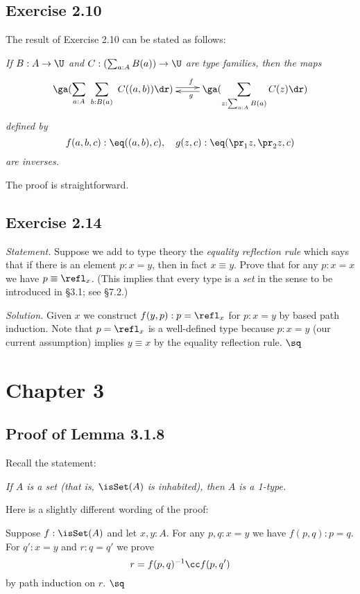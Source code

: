 \documentclass[12pt]{article}
\begin{document}

\subsection{Exercise 2.10}\label{210}

The result of Exercise 2.10 can be stated as follows:

\emph{If $B:A\to\U$ and $C:(\sum_{a:A}B(a))\to\U$ are type families, then the maps
$$
\xymatrix{
\displaystyle\ga(\sum_{a:A}\ \sum_{b:B(a)}\ C((a,b))\dr)\ar@<2pt>[r]^(.55)f&\displaystyle\ga(\sum_{z:\sum_{a:A}B(a)}C(z)\dr)\ar@<2pt>[l]^(.45)g}
$$ 
defined by 
$$
f(a,b,c):\eq((a,b),c),\quad g(z,c):\eq(\pr_1 z,\pr_2z,c)
$$ 
are inverses.}

The proof is straightforward.


\subsection{Exercise 2.14}

\emph{Statement.} Suppose we add to type theory the \emph{equality reflection rule} which says that if there is an element $p:x=y$, then in fact $x\equiv y$. Prove that for any $p:x=x$ we have $p\equiv\refl_x$. (This implies that every type is a \emph{set} in the sense to be introduced in \S3.1; see \S7.2.)

\nn\emph{Solution.} Given $x$ we construct $f(y,p):p=\refl_x$ for $p:x=y$ by based path induction. Note that $p=\refl_x$ is a well-defined type because $p:x=y$ (our current assumption) implies $y\equiv x$ by the equality reflection rule. $\sq$


\section{Chapter 3}

\subsection{Proof of Lemma 3.1.8}\label{318}

Recall the statement: 

\emph{If $A$ is a set (that is, $\isSet(A)$ is inhabited), then $A$ is a 1-type.} 

Here is a slightly different wording of the proof:

Suppose $f:\isSet(A)$ and let $x,y:A$. For any $p,q:x=y$ we have $f(p,q):p=q$. For $q':x=y$ and $r:q=q'$ we prove 
$$
r=f(p,q)^{-1}\cc f(p,q')
$$ 
by path induction on $r$. $\sq$
\end{document}

